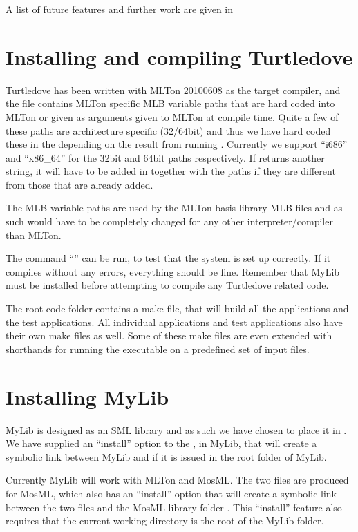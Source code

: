 A list of future features and further work are given in 


\section{Installing and compiling Turtledove}
Turtledove has been written with MLTon 20100608 as the target compiler, and the
 file contains MLTon specific MLB variable paths that
are hard coded into MLTon or given as arguments given to MLTon at compile
time. Quite a few of these paths are architecture specific (32/64bit) and thus
we have hard coded these in the  depending on the result from
running . Currently we support ``i686'' and ``x86_64'' for the
32bit and 64bit paths respectively. If  returns another string, it
will have to be added in  together with the paths if they are
different from those that are already added.  

The MLB variable paths are used by the MLTon basis library MLB files and as such
would have to be completely changed for any other interpreter/compiler than
MLTon.

The command ``'' can be run, to test that the system
is set up correctly. If it compiles without any errors, everything should be
fine. Remember that MyLib must be installed before attempting to compile any
Turtledove related code.

The root code folder contains a make file, that will build all the
applications and the test applications. All individual applications and test
applications also have their own make files as well. Some of these make files
are even extended with shorthands for running the executable on a predefined set
of input files.

\section{Installing MyLib}
MyLib is designed as an SML library and as such we have chosen to place it in
. We have supplied an ``install'' option to the
, in MyLib, that will create a symbolic link between MyLib and
 if it is issued in the root folder of MyLib.

Currently MyLib will work with MLTon and MosML. The two  files
are produced for MosML, which also has an ``install'' option that will create a
symbolic link between the two files and the MosML library folder
. This ``install'' feature also requires that the current
working directory is the root of the MyLib folder.

